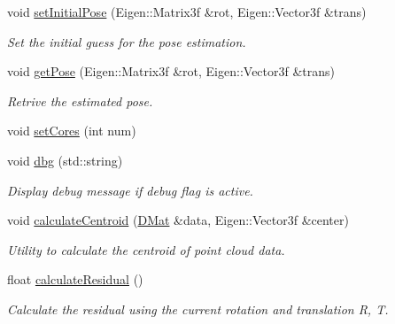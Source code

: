 \begin{DoxyCompactItemize}
void \hyperlink{classPoseEstimate_af36ed6ccd1839eedff0f51f0bdaa23c7}{set\-Initial\-Pose} (\-Eigen\-::\-Matrix3f \&rot, \-Eigen\-::\-Vector3f \&trans)
\begin{DoxyCompactList}\small\item\em \-Set the initial guess for the pose estimation. \end{DoxyCompactList}\item 
void \hyperlink{classPoseEstimate_aa52680b9860a5a33201dfdd888e34c5a}{get\-Pose} (\-Eigen\-::\-Matrix3f \&rot, \-Eigen\-::\-Vector3f \&trans)
\begin{DoxyCompactList}\small\item\em \-Retrive the estimated pose. \end{DoxyCompactList}\item 
void \hyperlink{classPoseEstimate_a82d9fbf262d32338a9275f9cedee3f6c}{set\-Cores} (int num)
\item 
void \hyperlink{classPoseEstimate_a97197a2b7b19b8a975984841feaab1dc}{dbg} (std\-::string)
\begin{DoxyCompactList}\small\item\em \-Display debug message if debug flag is active. \end{DoxyCompactList}\item 
void \hyperlink{classPoseEstimate_a32bcf3736214b6635f9da6ad6be5f0ce}{calculate\-Centroid} (\hyperlink{common_8h_a4ec92c19d079ab17709ca464cfb8e5bd}{\-D\-Mat} \&data, \-Eigen\-::\-Vector3f \&center)
\begin{DoxyCompactList}\small\item\em \-Utility to calculate the centroid of point cloud data. \end{DoxyCompactList}\item 
float \hyperlink{classPoseEstimate_ae195b53478db98ca075a6f0359ea422c}{calculate\-Residual} ()
\begin{DoxyCompactList}\small\item\em \-Calculate the residual using the current rotation and translation \-R, \-T. \end{DoxyCompactList}\end{DoxyCompactItemize}
